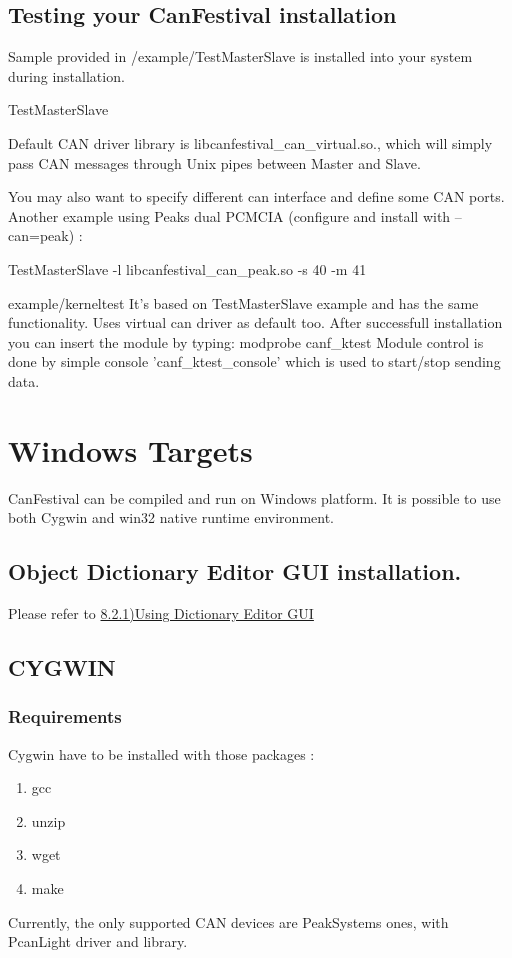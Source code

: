\documentclass[a4paper,12pt]{book}
\newcommand\liststyleLix{%
\renewcommand\labelitemi{{--}}
\renewcommand\labelitemii{{--}}
\renewcommand\labelitemiii{{--}}
\renewcommand\labelitemiv{{--}}
}
\begin{document}
\subsection{Testing your CanFestival installation}
Sample provided in /example/TestMasterSlave is installed into your
system during installation.

{\ttfamily
TestMasterSlave}

Default CAN driver library is libcanfestival\_can\_virtual.so., which
will simply pass CAN messages through Unix pipes between Master and
Slave. 

You may also want to specify different can interface and define some CAN
ports. Another example using Peak{\textquotesingle}s dual PCMCIA
(configure and install with {--}can=peak) :

{\ttfamily
TestMasterSlave {}-l libcanfestival\_can\_peak.so {}-s 40 {}-m 41}

{\ttfamily
example/kerneltest}
It's based on TestMasterSlave example and has the same functionality. Uses virtual can driver as default too. After successfull installation you can insert the module by typing:
	modprobe canf\_ktest
Module control is done by simple console 'canf\_ktest\_console' which is used to start/stop sending data.

\section{Windows Targets}
CanFestival can be compiled and run on Windows platform. It is possible
to use both Cygwin and win32 native runtime environment.

\subsection{Object Dictionary Editor GUI installation.}
Please refer to
\hyperlink{a821UsingDictionaryEditorGUIoutline}{8.2.1)Using Dictionary
Editor GUI}

\subsection{CYGWIN}
\subsubsection{Requirements}
Cygwin have to be installed with those packages :

\liststyleLix
\begin{enumerate}
\item gcc
\item unzip
\item wget
\item make
\end{enumerate}
Currently, the only supported CAN devices are PeakSystems ones, with
PcanLight driver and library. 
\end{document}
